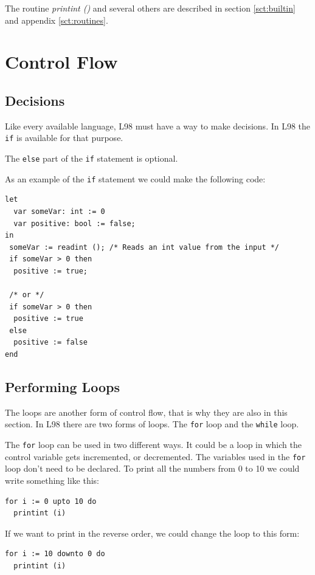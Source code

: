 \documentclass[a4paper, 11pt]{report}
\newcommand{\keyword}[1]{\texttt{#1}}
\begin{document}
The routine \emph{printint ()} and several others are described in section \ref{sct:builtin}
and appendix \ref{sct:routines}.

\section{Control Flow}

\subsection{Decisions}
Like every available language, L98 must have a way to make
decisions. In L98 the \keyword{if} is available for that
purpose.

The \keyword{else} part of the \keyword{if} statement is
optional.

As an example of the \keyword{if} statement we could make
the following code:

\begin{lstlisting}
let
  var someVar: int := 0
  var positive: bool := false;
in
 someVar := readint (); /* Reads an int value from the input */
 if someVar > 0 then
  positive := true;

 /* or */
 if someVar > 0 then
  positive := true
 else
  positive := false
end
\end{lstlisting}

\subsection{Performing Loops}
The loops are another form of control flow, that is why they are also in
this section.
In L98 there are two forms of loops. The \keyword{for} loop and the
\keyword{while} loop.

The \keyword{for} loop can be used in two different ways. It could be
a loop in which the control variable gets incremented, or decremented.
The variables used in the \keyword{for} loop don't need to be declared.
To print all the numbers from 0 to 10 we could write something like this:

\begin{lstlisting}
for i := 0 upto 10 do
  printint (i)
\end{lstlisting}

If we want to print in the reverse order, we could change the loop to
this form:
\begin{lstlisting}
for i := 10 downto 0 do
  printint (i)
\end{lstlisting}
\end{document}
